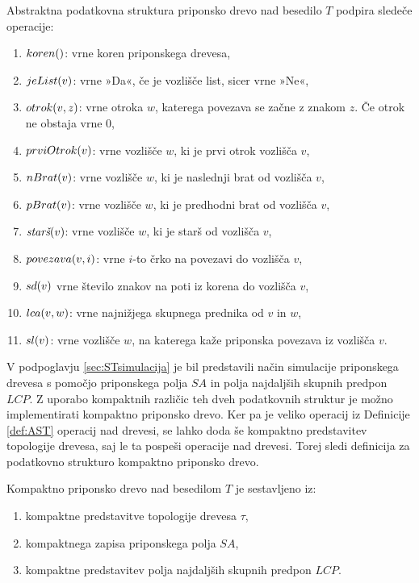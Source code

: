 \begin{defi}\label{def:AST}
    Abstraktna podatkovna struktura priponsko drevo nad besedilo $T$ podpira sledeče operacije:
    \begin{enumerate}
        \item $\Koren$: vrne koren priponskega drevesa,
        \item $\List{v}$: vrne »Da«, če je vozlišče list, sicer vrne »Ne«,
        \item $\Otrok{v}{z}$: vrne otroka $w$, katerega povezava se začne z znakom $z$. Če otrok ne obstaja vrne 0,
        \item $\PrviOtrok{v}$: vrne vozlišče $w$, ki je prvi otrok vozlišča $v$,
        \item $\NBrat{v}$: vrne vozlišče $w$, ki je naslednji brat od vozlišča $v$,
        \item $\PBrat{v}$: vrne vozlišče $w$, ki je predhodni brat od vozlišča $v$,
        \item $\Stars{v}$: vrne vozlišče $w$, ki je starš od vozlišča $v$,
        \item $\Povezava{v}{i}$: vrne $i$-to črko na povezavi do vozlišča $v$,
        \item $\Sd{v}$ vrne število znakov na poti iz korena do vozlišča $v$,
        \item $\Lca{v}{w}$: vrne najnižjega skupnega prednika od $v$ in $w$,
        \item $\Sl{v}$: vrne vozlišče $w$, na katerega kaže priponska povezava iz vozlišča $v$.
    \end{enumerate}
\end{defi}

V podpoglavju \ref{sec:STsimulacija} je bil predstavili način simulacije priponskega drevesa s pomočjo priponskega polja $SA$ in polja najdaljših skupnih predpon $LCP$. Z uporabo kompaktnih različic teh dveh podatkovnih struktur je možno implementirati kompaktno priponsko drevo. Ker pa je veliko operacij iz Definicije \ref{def:AST} operacij nad drevesi, se lahko doda še kompaktno predstavitev topologije drevesa, saj le ta pospeši operacije nad drevesi. Torej sledi definicija za podatkovno strukturo kompaktno priponsko drevo.

\begin{defi}
    Kompaktno priponsko drevo nad besedilom $T$ je sestavljeno iz:
    \begin{enumerate}
        \item kompaktne predstavitve topologije drevesa $\tau$,
        \item kompaktnega zapisa priponskega polja $SA$, %
        \item kompaktne predstavitev polja najdaljših skupnih predpon $LCP$.
    \end{enumerate}
\end{defi}


